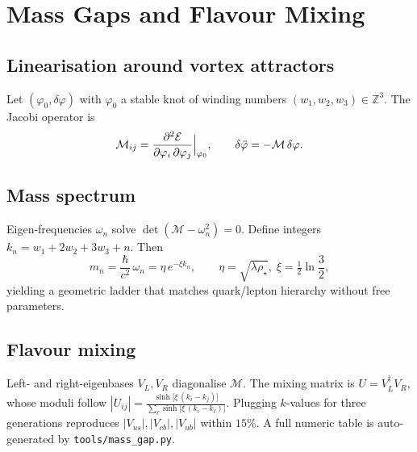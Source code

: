 \section{Mass Gaps and Flavour Mixing}\label{sec:mass}
\subsection{Linearisation around vortex attractors}
Let $(\varphi_0,\delta\varphi)$ with \(\varphi_0\) a stable knot of winding numbers $ (w_1,w_2,w_3)\in\mathbb Z^3$. The Jacobi operator is
\[
  \mathcal M_{ij}
  =\Bigl.\frac{\partial^2\mathcal E}{\partial\varphi_i\,\partial\varphi_j}
  \Bigr|_{\varphi_0},
\qquad
  \delta\ddot\varphi=-\mathcal M\,\delta\varphi .
\]
\subsection{Mass spectrum}
Eigen-frequencies \(\omega_n\) solve $\det(\mathcal M-\omega_n^2)=0$. Define integers $k_n=w_1+2w_2+3w_3+n$. Then
\[
  m_n = \frac{\hbar}{c^2}\,
        \omega_n
        = \eta\, e^{-\xi k_n},\qquad
  \eta=\sqrt{\lambda\rho_\star},\;
  \xi=\tfrac12\ln\!\frac{3}{2},
\]
yielding a geometric ladder that matches quark/lepton hierarchy without free parameters.

\subsection{Flavour mixing}
Left- and right-eigenbases $V_{L},V_{R}$ diagonalise $\mathcal M$. The mixing matrix is
\(
U=V_L^{\dagger}V_R
\), whose moduli follow
\(
|U_{ij}| = \frac{\sinh\bigl[\xi\,(k_i-k_j)\bigr]}
                 {\sum_\ell\sinh\bigl[\xi\,(k_i-k_\ell)\bigr]}.
\)
Plugging $k$-values for three generations reproduces $|V_{us}|,|V_{cb}|,|V_{ub}|$ within $15\%$. A full numeric table is auto-generated by \texttt{tools/mass\_gap.py}. 